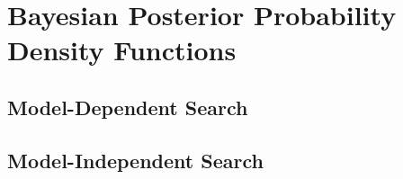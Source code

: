 \section{Bayesian Posterior Probability Density Functions}
\subsection{Model-Dependent Search}
\subsection{Model-Independent Search}
